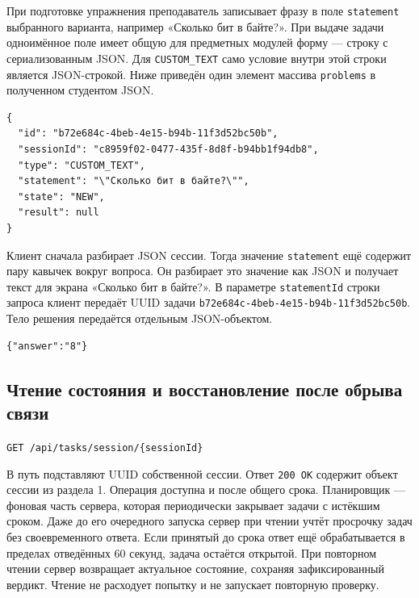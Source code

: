 \documentclass[12pt,a4paper]{article}
\begin{document}
\hypertarget{как-передаётся-текстовый-вариант}{}

При подготовке упражнения преподаватель записывает фразу в поле \texttt{statement} выбранного варианта, например «Сколько бит в байте?». При выдаче задачи одноимённое поле имеет общую для предметных модулей форму --- строку с сериализованным JSON. Для \texttt{CUSTOM\_\allowbreak{}TEXT} само условие внутри этой строки является JSON-строкой. Ниже приведён один элемент массива \texttt{problems} в полученном студентом JSON.

\begin{verbatim}
{
  "id": "b72e684c-4beb-4e15-b94b-11f3d52bc50b",
  "sessionId": "c8959f02-0477-435f-8d8f-b94bb1f94db8",
  "type": "CUSTOM_TEXT",
  "statement": "\"Сколько бит в байте?\"",
  "state": "NEW",
  "result": null
}
\end{verbatim}

Клиент сначала разбирает JSON сессии. Тогда значение \texttt{statement} ещё содержит пару кавычек вокруг вопроса. Он разбирает это значение как JSON и получает текст для экрана «Сколько бит в байте?». В параметре \texttt{statement\allowbreak{}Id} строки запроса клиент передаёт UUID задачи \texttt{b72e684c-\allowbreak{}4beb-\allowbreak{}4e15-\allowbreak{}b94b-\allowbreak{}11f3d52bc50b}. Тело решения передаётся отдельным JSON-объектом.

\begin{verbatim}
{"answer":"8"}
\end{verbatim}

\subsection{Чтение состояния и восстановление после обрыва связи}\label{3-ux447ux442ux435ux43dux438ux435-ux441ux43eux441ux442ux43eux44fux43dux438ux44f-ux438-ux432ux43eux441ux441ux442ux430ux43dux43eux432ux43bux435ux43dux438ux435-ux43fux43eux441ux43bux435-ux43eux431ux440ux44bux432ux430-ux441ux432ux44fux437ux438}

\hypertarget{3-чтение-состояния-и-восстановление-после-обрыва-связи}{}

\texttt{GET /\allowbreak{}api/\allowbreak{}tasks/\allowbreak{}session/\allowbreak{}\{session\allowbreak{}Id\}}

В путь подставляют UUID собственной сессии. Ответ \texttt{200\ OK} содержит объект сессии из раздела 1. Операция доступна и после общего срока. Планировщик --- фоновая часть сервера, которая периодически закрывает задачи с истёкшим сроком. Даже до его очередного запуска сервер при чтении учтёт просрочку задач без своевременного ответа. Если принятый до срока ответ ещё обрабатывается в пределах отведённых 60 секунд, задача остаётся открытой. При повторном чтении сервер возвращает актуальное состояние, сохраняя зафиксированный вердикт. Чтение не расходует попытку и не запускает повторную проверку.
\end{document}
